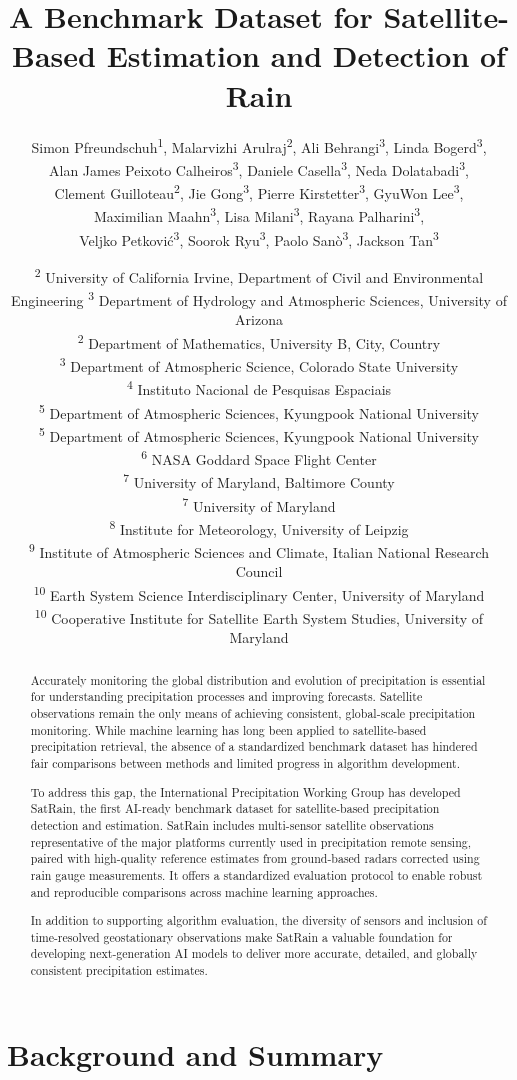 \documentclass[11pt]{article}
\title{A Benchmark Dataset for Satellite-Based Estimation and Detection of Rain}
\author{%
	Simon Pfreundschuh\textsuperscript{1}, %
	Malarvizhi Arulraj\textsuperscript{2}, %
	Ali Behrangi\textsuperscript{3}, %
	Linda Bogerd\textsuperscript{3}, \\
	Alan James Peixoto Calheiros\textsuperscript{3}, %
	Daniele Casella\textsuperscript{3}, %
	Neda Dolatabadi\textsuperscript{3}, \\ %
	Clement Guilloteau\textsuperscript{2}, %
	Jie Gong\textsuperscript{3}, %
	Pierre Kirstetter\textsuperscript{3}, %
	GyuWon Lee\textsuperscript{3}, \\ %
	Maximilian Maahn\textsuperscript{3}, %
	Lisa Milani\textsuperscript{3}, %
	Rayana Palharini\textsuperscript{3},\\%
	Veljko Petković\textsuperscript{3}, %
	Soorok Ryu\textsuperscript{3}, %
	Paolo Sanò\textsuperscript{3}, %
	Jackson Tan\textsuperscript{3}\\
}
\date{
	\textsuperscript{2} University of California Irvine, Department of Civil and Environmental Engineering
	\textsuperscript{3} Department of Hydrology and Atmospheric Sciences, University of Arizona\\
	\textsuperscript{2} Department of Mathematics, University B, City, Country \\
	\textsuperscript{3} Department of Atmospheric Science, Colorado State University \\
	\textsuperscript{4} Instituto Nacional de Pesquisas Espaciais \\
	\textsuperscript{5} Department of Atmospheric Sciences, Kyungpook National University \\
	\textsuperscript{5} Department of Atmospheric Sciences, Kyungpook National University \\
	\textsuperscript{6} NASA Goddard Space Flight Center \\
	\textsuperscript{7} University of Maryland, Baltimore County \\
	\textsuperscript{7} University of Maryland\\
	\textsuperscript{8} Institute for Meteorology, University of Leipzig \\
	\textsuperscript{9} Institute of Atmospheric Sciences and Climate, Italian National Research Council \\
	\textsuperscript{10} Earth System Science Interdisciplinary Center, University of Maryland  \\
	\textsuperscript{10} Cooperative Institute for Satellite Earth System Studies, University of Maryland  \\
}
\date{}
\begin{document}
\maketitle

\begin{abstract}

	Accurately monitoring the global distribution and evolution of precipitation is
	essential for understanding precipitation processes and improving forecasts.
	Satellite observations remain the only means of achieving consistent,
	global-scale precipitation monitoring. While machine learning has long been
	applied to satellite-based precipitation retrieval, the absence of a
	standardized benchmark dataset has hindered fair comparisons between methods and
	limited progress in algorithm development.

	To address this gap, the International Precipitation Working Group has developed
	SatRain, the first AI-ready benchmark dataset for satellite-based precipitation
	detection and estimation. SatRain includes multi-sensor satellite observations
	representative of the major platforms currently used in precipitation remote
	sensing, paired with high-quality reference estimates from ground-based radars
	corrected using rain gauge measurements. It offers a standardized evaluation
	protocol to enable robust and reproducible comparisons across machine learning
	approaches.

	In addition to supporting algorithm evaluation, the diversity of sensors and
	inclusion of time-resolved geostationary observations make SatRain a valuable
	foundation for developing next-generation AI models to deliver more accurate,
	detailed, and globally consistent precipitation estimates.

\end{abstract}

\section{Background and Summary}
\end{document}
